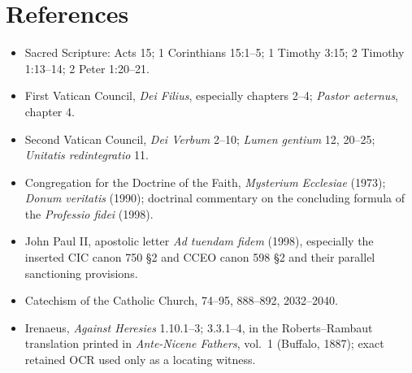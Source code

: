 \section{References}
\begin{itemize}
\item Sacred Scripture: Acts 15; 1 Corinthians 15:1--5; 1 Timothy 3:15; 2
Timothy 1:13--14; 2 Peter 1:20--21.
\item First Vatican Council, \emph{Dei Filius}, especially chapters 2--4;
\emph{Pastor aeternus}, chapter 4.
\item Second Vatican Council, \emph{Dei Verbum} 2--10; \emph{Lumen gentium}
12, 20--25; \emph{Unitatis redintegratio} 11.
\item Congregation for the Doctrine of the Faith, \emph{Mysterium Ecclesiae}
(1973); \emph{Donum veritatis} (1990); doctrinal commentary on the concluding
formula of the \emph{Professio fidei} (1998).
\item John Paul II, apostolic letter \emph{Ad tuendam fidem} (1998), especially
the inserted CIC canon 750 \S2 and CCEO canon 598 \S2 and their parallel
sanctioning provisions.
\item Catechism of the Catholic Church, 74--95, 888--892, 2032--2040.
\item Irenaeus, \emph{Against Heresies} 1.10.1--3; 3.3.1--4, in the
Roberts--Rambaut translation printed in \emph{Ante-Nicene Fathers}, vol.~1
(Buffalo, 1887); exact retained OCR used only as a locating witness.
\end{itemize}


